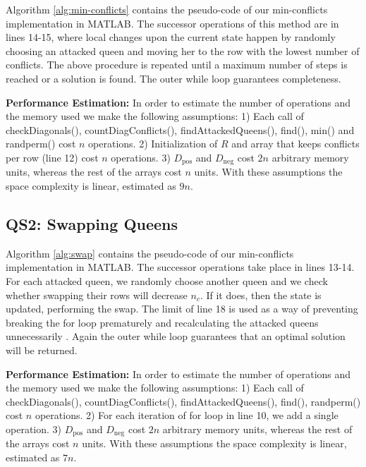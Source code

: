 Algorithm \ref{alg:min-conflicts} contains the pseudo-code of our min-conflicts implementation in MATLAB. The successor operations of this method are in lines 14-15, where local changes upon the current state happen by randomly choosing an attacked queen and moving her to the row with the lowest number of conflicts. The above procedure is repeated until a maximum number of steps is reached or a solution is found. The outer while loop guarantees completeness.

\textbf{Performance Estimation:} In order to estimate the number of operations and the memory used we make the following assumptions: 1) Each call of checkDiagonals(), countDiagConflicts(), findAttackedQueens(), find(), min() and randperm() cost $n$ operations. 2) Initialization of $R$ and array that keeps conflicts per row (line 12) cost $n$ operations. 3) $D_{\text{pos}}$ and $D_{\text{neg}}$ cost $2n$ arbitrary memory units, whereas the rest of the arrays cost $n$ units. With these assumptions the space complexity is linear, estimated as $9n$.



\subsection{QS2: Swapping Queens}

Algorithm \ref{alg:swap} contains the pseudo-code of our min-conflicts implementation in MATLAB. The successor operations take place in lines 13-14. For each attacked queen, we randomly choose another queen and we check whether swapping their rows will decrease $n_c$. If it does, then the state is updated, performing the swap. The limit of line 18 is used as a way of preventing breaking the for loop prematurely and recalculating the attacked queens unnecessarily \citep{sosic91}. Again the outer while loop guarantees that an optimal solution will be returned.

\textbf{Performance Estimation:} In order to estimate the number of operations and the memory used we make the following assumptions: 1) Each call of checkDiagonals(), countDiagConflicts(), findAttackedQueens(), find(), randperm() cost $n$ operations. 2) For each iteration of for loop in line 10, we add a single operation. 3) $D_{\text{pos}}$ and $D_{\text{neg}}$ cost $2n$ arbitrary memory units, whereas the rest of the arrays cost $n$ units. With these assumptions the space complexity is linear,  estimated as $7n$.

